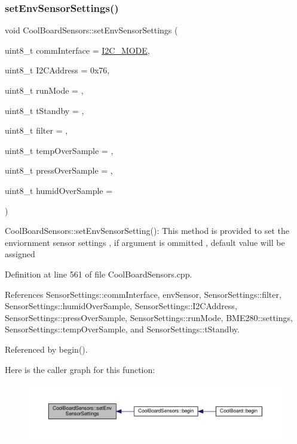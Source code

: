 \subsubsection{\texorpdfstring{set\+Env\+Sensor\+Settings()}{setEnvSensorSettings()}}
{\footnotesize\ttfamily void Cool\+Board\+Sensors\+::set\+Env\+Sensor\+Settings (\begin{DoxyParamCaption}\item[{uint8\+\_\+t}]{comm\+Interface = {\ttfamily \hyperlink{_cool_spark_fun_b_m_e280_8h_a5cd01756030509b764d43a2b8c94fce8}{I2\+C\+\_\+\+M\+O\+DE}},  }\item[{uint8\+\_\+t}]{I2\+C\+Address = {\ttfamily 0x76},  }\item[{uint8\+\_\+t}]{run\+Mode = {},  }\item[{uint8\+\_\+t}]{t\+Standby = {},  }\item[{uint8\+\_\+t}]{filter = {},  }\item[{uint8\+\_\+t}]{temp\+Over\+Sample = {},  }\item[{uint8\+\_\+t}]{press\+Over\+Sample = {},  }\item[{uint8\+\_\+t}]{humid\+Over\+Sample = {} }\end{DoxyParamCaption})}

Cool\+Board\+Sensors\+::set\+Env\+Sensor\+Setting()\+: This method is provided to set the enviornment sensor settings , if argument is ommitted , default value will be assigned 

Definition at line 561 of file Cool\+Board\+Sensors.\+cpp.



References Sensor\+Settings\+::comm\+Interface, env\+Sensor, Sensor\+Settings\+::filter, Sensor\+Settings\+::humid\+Over\+Sample, Sensor\+Settings\+::\+I2\+C\+Address, Sensor\+Settings\+::press\+Over\+Sample, Sensor\+Settings\+::run\+Mode, B\+M\+E280\+::settings, Sensor\+Settings\+::temp\+Over\+Sample, and Sensor\+Settings\+::t\+Standby.



Referenced by begin().

Here is the caller graph for this function\+:
\nopagebreak
\begin{figure}[H]
\begin{center}
\leavevmode
\includegraphics[width=350pt]{de/d46/class_cool_board_sensors_a406307ffd70272282d91479c7ed8d66f_icgraph}
\end{center}
\end{figure}
\mbox{\label{class_cool_board_sensors_a6944b6ea7bce8e2fce1b434acfd9d5f3}} 

